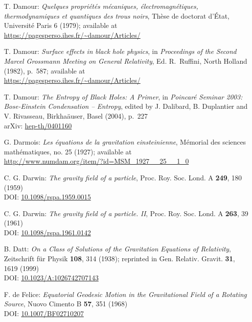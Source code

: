 \begin{thebibliography}{123}
T. Damour: {\em Quelques propri\'et\'es m\'ecaniques, \'electromagn\'etiques,
thermo\-dy\-na\-mi\-ques et quantiques des trous noirs},
Th\`ese de doctorat d'\'Etat, Universit\'e Paris 6 (1979); available at\\
\url{https://pagesperso.ihes.fr/~damour/Articles/}

T. Damour: {\em Surface effects in black hole physics},
in {\em Proceedings of the Second Marcel Grossmann Meeting on General
Relativity}, Ed. R.~Ruffini, North Holland (1982), p.~587; available at\\
\url{https://pagesperso.ihes.fr/~damour/Articles/}

T. Damour: {\em The Entropy of Black Holes: A Primer},
in {\em Poincaré Seminar 2003: Bose-Einstein Condensation -- Entropy},
edited by J. Dalibard, B. Duplantier and V. Rivasseau, Birkha\"auser, Basel (2004),
p.~227\\
arXiv: \href{https://arxiv.org/abs/hep-th/0401160}{hep-th/0401160}

G. Darmois:
{\em Les équations de la gravitation einsteinienne},
Mémorial des sciences mathématiques, no. 25 (1927); available at\\
\url{http://www.numdam.org/item/?id=MSM_1927__25__1_0}

C. G. Darwin: {\em The gravity field of a particle},
Proc. Roy. Soc. Lond. A {\bf 249}, 180 (1959)\\
DOI: \href{https://doi.org/10.1098/rspa.1959.0015}{10.1098/rspa.1959.0015}

C. G. Darwin: {\em The gravity field of a particle. II},
Proc. Roy. Soc. Lond. A {\bf 263}, 39 (1961)\\
DOI: \href{https://doi.org/10.1098/rspa.1961.0142}{10.1098/rspa.1961.0142}

B. Datt:
{\em On a Class of Solutions of the Gravitation Equations of Relativity},
Zeitschrift für Physik {\bf 108}, 314 (1938);
reprinted in Gen. Relativ. Gravit. {\bf 31}, 1619 (1999)\\
DOI: \href{https://doi.org/10.1023/A:1026742707143}{10.1023/A:1026742707143}

F. de Felice:
{\em Equatorial Geodesic Motion in the Gravitational Field of a Rotating Source},
Nuovo Cimento B {\bf 57}, 351 (1968)\\
DOI: \href{https://doi.org/10.1007/BF02710207}{10.1007/BF02710207}


\end{thebibliography}
